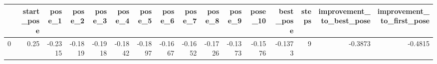 \begin{tabular}{lrrrrrrrrrrrrrrr}
\toprule
{} &  start\_pose &  pose\_1 &  pose\_2 &  pose\_3 &  pose\_4 &  pose\_5 &  pose\_6 &  pose\_7 &  pose\_8 &  pose\_9 &  pose\_10 &  best\_pose &  steps &  improvement\_to\_best\_pose &  improvement\_to\_first\_pose \\
\midrule
0 &        0.25 & -0.2315 & -0.1819 & -0.1918 & -0.1842 & -0.1897 & -0.1667 & -0.1652 & -0.1726 & -0.1373 &  -0.1576 &    -0.1373 &      9 &                   -0.3873 &                    -0.4815 \\
\bottomrule
\end{tabular}
